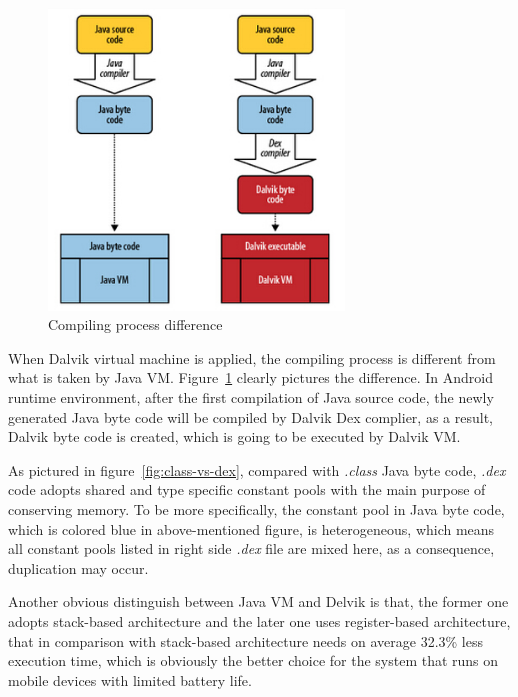 \documentclass[]{llncs}
\begin{document}
 \begin{figure}[!htbp]
	\centering
	\includegraphics[width=0.7\textwidth]{vm-compare.jpg}
		\caption[]{Compiling process difference\cite{learn_android}}
	\label{fig:vm-compare}
\end{figure}
When Dalvik virtual machine is applied, the compiling process is different from what is taken by Java VM. Figure~\ref{fig:vm-compare} clearly pictures the difference. In Android runtime environment, after the first compilation of Java source code, the newly generated Java byte code will be compiled by Dalvik Dex complier, as a result, Dalvik byte code is created, which is going to be executed by Dalvik VM.

As pictured in figure~\ref{fig:class-vs-dex}, compared with \emph{.class} Java byte code, \emph{.dex} code adopts shared and type specific constant pools with the main purpose of conserving memory\cite{android_vm}. To be more specifically,  the constant pool in Java byte code, which is colored blue in above-mentioned figure, is heterogeneous, which means all constant pools listed in right side \emph{.dex} file are mixed here, as a consequence, duplication may occur.    

Another obvious distinguish between Java VM and Delvik is that, the former one adopts stack-based architecture and  the later one uses register-based architecture, that in comparison with stack-based architecture needs on average 32.3\% less execution time\cite{android_vm}, which is obviously the better choice for the system that runs on mobile devices with limited battery life.
\end{document}

